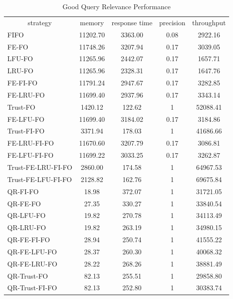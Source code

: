 \begin{table}[!htbp]
	\centering
    \caption{Good Query Relevance Performance}
    \label{tab:6-qrp}
    \begin{tabular}{|l||c|c|c|c|} \hline
         \multicolumn{1}{|c||}{strategy} & memory & response time & precision & throughput \\ \hhline{|=#=|=|=|=|}
FIFO             & 11202.70 & 3363.00 & 0.08 & 2922.16\\ \hline 
FE-FO             & 11748.26 & 3207.94 & 0.17 & 3039.05\\ \hline 
LFU-FO            & 11265.96 & 2442.07 & 0.17 & 1657.71\\ \hline 
LRU-FO            & 11265.96 & 2328.31 & 0.17 & 1647.76\\ \hline 
FE-FI-FO           & 11791.24 & 2947.67 & 0.17 & 3282.85\\ \hline 
FE-LRU-FO          & 11699.40 & 2937.96 & 0.17 & 3343.14\\ \hline 
Trust-FO          & 1420.12 & 122.62 & 1 & 52088.41\\ \hline 
FE-LFU-FO          & 11699.40 & 3184.02 & 0.17 & 3184.86\\ \hline 
Trust-FI-FO        & 3371.94 & 178.03 & 1 & 41686.66\\ \hline 
FE-LRU-FI-FO        & 11670.60 & 3207.79 & 0.17 & 3086.81\\ \hline 
FE-LFU-FI-FO        & 11699.22 & 3033.25 & 0.17 & 3262.87\\ \hline 
Trust-FE-LRU-FI-FO   & 2860.00 & 174.58 & 1 & 64967.53\\ \hline 
Trust-FE-LFU-FI-FO   & 2128.82 & 162.76 & 1 & 69675.84\\ \hhline{|=#=|=|=|=|}
QR-FI-FO           & 18.98 & 372.07 & 1 & 31721.05\\ \hline 
QR-FE-FO           & 27.35 & 330.27 & 1 & 33840.54\\ \hline 
QR-LFU-FO          & 19.82 & 270.78 & 1 & 34113.49\\ \hline 
QR-LRU-FO          & 19.82 & 263.19 & 1 & 34980.15\\ \hline 
QR-FE-FI-FO         & 28.94 & 250.74 & 1 & 41555.22\\ \hline 
QR-FE-LFU-FO        & 28.37 & 260.30 & 1 & 40068.32\\ \hline 
QR-FE-LRU-FO        & 28.22 & 268.26 & 1 & 38881.49\\ \hline 
QR-Trust-FO        & 82.13 & 255.51 & 1 & 29858.80\\ \hline 
QR-Trust-FI-FO      & 82.13 & 252.80 & 1 & 30383.74\\ \hline 

\end{tabular}
\end{table}
